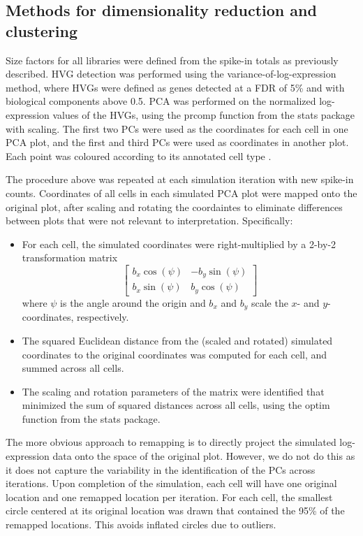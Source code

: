 \documentclass{article}
\begin{document}
\subsection{Methods for dimensionality reduction and clustering}
Size factors for all libraries were defined from the spike-in totals as previously described. 
HVG detection was performed using the variance-of-log-expression method, where HVGs were defined as genes detected at a FDR of 5\% and with biological components above 0.5.
PCA was performed on the normalized log-expression values of the HVGs, using the prcomp function from the stats package with scaling.
The first two PCs were used as the coordinates for each cell in one PCA plot, and the first and third PCs were used as coordinates in another plot.
Each point was coloured according to its annotated cell type \citep{segerstople2016single}.

The procedure above was repeated at each simulation iteration with new spike-in counts.
Coordinates of all cells in each simulated PCA plot were mapped onto the original plot, after scaling and rotating the coordaintes to eliminate differences between plots that were not relevant to interpretation.
Specifically:
\begin{itemize}
    \item For each cell, the simulated coordinates were right-multiplied by a 2-by-2 transformation matrix
        \[
            \left[\begin{array}{cc}
                    b_x \cos(\psi) & - b_y \sin(\psi) \\
                    b_x \sin(\psi) & b_y \cos(\psi) 
                \end{array}
            \right]
        \]
        where $\psi$ is the angle around the origin and $b_x$ and $b_y$ scale the $x$- and $y$-coordinates, respectively.
    \item The squared Euclidean distance from the (scaled and rotated) simulated coordinates to the original coordinates was computed for each cell, and summed across all cells.
    \item The scaling and rotation parameters of the matrix were identified that minimized the sum of squared distances across all cells, using the optim function from the stats package.
\end{itemize}
The more obvious approach to remapping is to directly project the simulated log-expression data onto the space of the original plot.
However, we do not do this as it does not capture the variability in the identification of the PCs across iterations.
Upon completion of the simulation, each cell will have one original location and one remapped location per iteration. 
For each cell, the smallest circle centered at its original location was drawn that contained the 95\% of the remapped locations.
This avoids inflated circles due to outliers.
\end{document}
